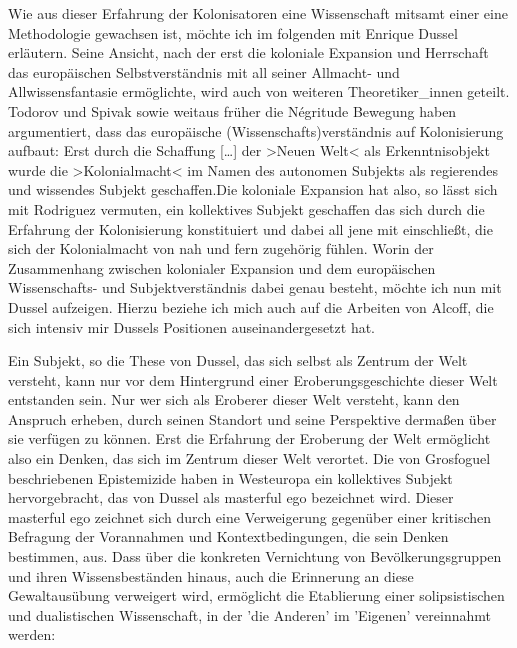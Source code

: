 Wie aus dieser Erfahrung der Kolonisatoren eine Wissenschaft mitsamt einer eine
Methodologie gewachsen ist, möchte ich im folgenden mit Enrique Dussel
erläutern. Seine Ansicht, nach der erst die koloniale Expansion und Herrschaft
das europäischen Selbstverständnis mit all seiner Allmacht- und
Allwissensfantasie ermöglichte, wird auch von weiteren Theoretiker\_innen
geteilt. Todorov und Spivak sowie weitaus früher die Négritude Bewegung haben
argumentiert, dass das europäische (Wissenschafts)verständnis auf Kolonisierung
aufbaut: Erst durch die \glqq Schaffung […] der >Neuen Welt< als
Erkenntnisobjekt wurde die >Kolonialmacht< im Namen des autonomen Subjekts als
regierendes und wissendes Subjekt geschaffen.\grqq Die koloniale Expansion
hat also, so lässt sich mit Rodriguez vermuten, ein kollektives Subjekt
geschaffen das sich durch die Erfahrung der Kolonisierung konstituiert und
dabei all jene mit einschließt, die sich der Kolonialmacht von nah und fern
zugehörig fühlen.  Worin der Zusammenhang zwischen kolonialer Expansion und dem
europäischen Wissenschafts- und Subjektverständnis dabei genau besteht, möchte
ich nun mit Dussel aufzeigen. Hierzu beziehe ich mich auch auf die Arbeiten von
Alcoff, die sich intensiv mir Dussels Positionen auseinandergesetzt hat. 

Ein Subjekt, so die These von Dussel, das sich selbst als Zentrum der Welt
versteht, kann nur vor dem Hintergrund einer Eroberungsgeschichte dieser Welt
entstanden sein. Nur wer sich als Eroberer dieser Welt versteht, kann den
Anspruch erheben, durch seinen Standort und seine Perspektive dermaßen über sie
verfügen zu können. Erst die Erfahrung der Eroberung der Welt ermöglicht also
ein Denken, das sich im Zentrum dieser Welt verortet. Die von Grosfoguel
beschriebenen Epistemizide haben in Westeuropa ein kollektives Subjekt
hervorgebracht, das von Dussel als \glqq masterful ego \grqq \footnotemark
{} bezeichnet wird. Dieser
\glqq masterful ego \grqq zeichnet sich durch eine Verweigerung gegenüber einer
kritischen Befragung der Vorannahmen und Kontextbedingungen, die sein Denken
bestimmen, aus. Dass über die konkreten Vernichtung von Bevölkerungsgruppen und
ihren Wissensbeständen hinaus, auch die Erinnerung an diese Gewaltausübung
verweigert wird, ermöglicht die Etablierung einer solipsistischen und
dualistischen Wissenschaft, in der 'die Anderen' im 'Eigenen' vereinnahmt
werden:



